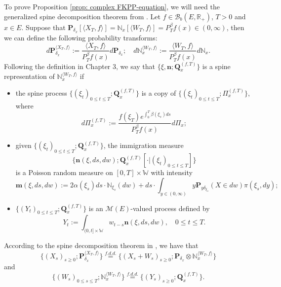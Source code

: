 \documentclass[UTF8]{pkuthss}
\theoremstyle{plain}
\theoremstyle{definition}
\numberwithin{equation}{section}
\begin{document}
    To prove Proposition \ref{prop: complex FKPP-equation}, we will need the generalized spine decomposition theorem from \cite{RenSongSun2019Spine}. 
    Let $f\in \mathcal B_b(E,\mathbb R_+)$, $T >0$ and $x\in E$.
    Suppose that $\mathbf P_{\delta_x}[\langle X_T, f\rangle] = \mathbb N_x[\langle W_T, f\rangle] = P^{\beta}_T f(x) \in (0,\infty)$, then we can define the following probability transforms:
\begin{equation}
    d\mathbf P_{\delta_x}^{\langle X_T, f\rangle}
    := \frac{\langle X_T, f\rangle}{P_T^{\beta} f(x)} d\mathbf P_{\delta_x};
    \quad d\mathbb N_x^{\langle W_T, f\rangle}
    :=  \frac{\langle W_T, f\rangle}{P_T^{\beta} f(x)} d\mathbb N_x.
\end{equation}
    Following the definition in Chapter 3, we say that $\{\xi, \mathbf n;\mathbf Q_{x}^{(f,T)}\}$ is a spine representation of $\mathbb N_x^{\langle W_T, f\rangle}$ if
\begin{itemize}
\item
    the spine process $\{(\xi_t)_{0\leq t\leq T}; \mathbf Q^{(f,T)}_x\}$ is a copy of $\{(\xi_t)_{0\leq t\leq T}; \Pi^{(f,T)}_{x}\}$,
    where
\begin{equation}
    d\Pi_x^{(f,T)} := \frac{f(\xi_T)e^{\int_0^T \beta(\xi_s)ds}}{P^{\beta}_T f(x)} d \Pi_x;
\end{equation}
\item
    given $\{(\xi_t)_{0\leq t\leq T}; \mathbf Q^{(f,T)}_x\}$, the immigration measure 
\[ \{\mathbf n(\xi,ds,dw); \mathbf Q^{(f,T)}_x[\cdot |(\xi_t)_{0\leq t\leq T}]\}\]
    is a Poisson random measure on $[0,T] \times \mathbb W$ with intensity
\begin{equation}
\label{eq: conditional intensity}
    \mathbf m(\xi,ds,dw)
    := 2 \alpha(\xi_s) ds \cdot \mathbb N_{\xi_s}(dw) + ds \cdot \int_{y\in (0,\infty)} y \mathbf P_{y\delta_{\xi_s}}(X\in dw) \pi(\xi_s,dy);
\end{equation}
\item
    $\{(Y_t)_{0\leq t\leq T}; \mathbf Q^{(f,T)}_x\}$ is an $\mathcal M(E)$-valued process defined by
\begin{equation}
    Y_t
    := \int_{(0,t] \times \mathbb W} w_{t-s} \mathbf n(\xi,ds,dw),
    \quad 0 \leq t\leq T.
\end{equation}
\end{itemize}
    According to the spine decomposition theorem in \cite{RenSongSun2019Spine}, we have that
\begin{equation}
\label{eq: Spine decomposition 1}
    \{(X_s)_{s \geq 0};\mathbf P_{\delta_x}^{\langle X_T, f\rangle}\}
    \overset{f.d.d.}{=} \{(X_s + W_s)_{s \geq 0};\mathbf P_{\delta_x} \otimes \mathbb N_x^{\langle W_T, f\rangle} \}
\end{equation}
    and
\begin{equation}
\label{eq: Spine decomposition 2}
    \{(W_s)_{0\leq s\leq T};\mathbb N_x^{\langle W_T, f\rangle}\}
    \overset{f.d.d.}{=} \{(Y_s)_{s \geq 0};\mathbf Q_x^{(f,T)}\}.
\end{equation}
\end{document}
